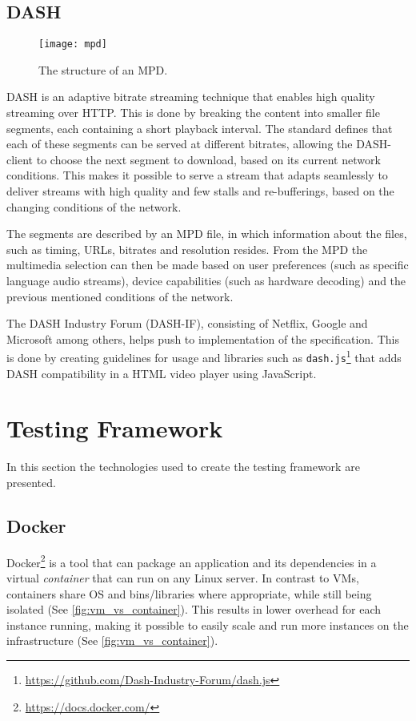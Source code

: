\subsection{\acl{DASH}}
\label{sec:rel-dash}

\begin{figure}
    \texttt{[image: mpd]}
    \caption[The structure of an \acs{MPD}.]{The structure of an \acs{MPD}.}
    \label{fig:mpd_structure}
\end{figure}

\ac{DASH} is an adaptive bitrate streaming technique that enables high quality streaming over \ac{HTTP}. This is done by breaking the content into smaller file segments, each containing a short playback interval. The standard defines that each of these segments can be served at different bitrates, allowing the \ac{DASH}-client to choose the next segment to download, based on its current network conditions.
This makes it possible to serve a stream that adapts seamlessly to deliver streams with high quality and few stalls and re-bufferings, based on the changing conditions of the network.

The segments are described by an \ac{MPD} file, in which information about the files, such as timing, \acp{URL}, bitrates and resolution resides. From the \ac{MPD} the multimedia selection can then be made based on user preferences (such as specific language audio streams), device capabilities (such as hardware decoding) and the previous mentioned conditions of the network.

The \ac{DASH} Industry Forum (DASH-IF), consisting of Netflix, Google and Microsoft among others, helps push to implementation of the specification\cite{ISO23009}. This is done by creating guidelines for usage and libraries such as \texttt{dash.js}\footnote{\url{https://github.com/Dash-Industry-Forum/dash.js}} that adds \ac{DASH} compatibility in a \ac{HTML} video player using JavaScript.

\section{Testing Framework}
In this section the technologies used to create the testing framework are presented.

\subsection{Docker}
 Docker\footnote{\url{https://docs.docker.com/}} is a tool that can package an application and its dependencies in a virtual \emph{container} that can run on any Linux server. In contrast to \acp{VM}, containers share \ac{OS} and bins/libraries where appropriate, while still being isolated (See \autoref{fig:vm_vs_container}). This results in lower overhead for each instance running, making it possible to easily scale and run more instances on the infrastructure (See \autoref{fig:vm_vs_container}).
 

